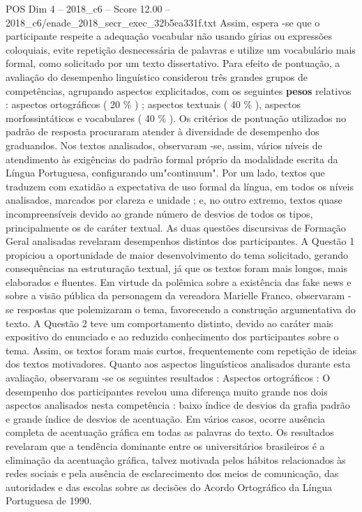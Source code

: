 \begin{textsample}{POS Dim 4 – 2018\_c6 – Score 12.00 – 2018\_c6/enade\_2018\_secr\_exec\_32b5ea331f.txt}
Assim, espera -se que o participante respeite a adequação vocabular não usando gírias ou expressões coloquiais, evite repetição desnecessária de palavras e utilize um vocabulário mais formal, como solicitado por um texto dissertativo.
Para efeito de pontuação, a avaliação do desempenho linguístico considerou três grandes grupos de competências, agrupando aspectos explicitados, com os seguintes \textbf{pesos} relativos : aspectos ortográficos ( 20 \% ) ; aspectos textuais ( 40 \% ), aspectos morfossintáticos e vocabulares ( 40 \% ).
Os critérios de pontuação utilizados no padrão de resposta procuraram atender à diversidade de desempenho dos graduandos.
Nos textos analisados, observaram -se, assim, vários níveis de atendimento às exigências do padrão formal próprio da modalidade escrita da Língua Portuguesa, configurando um"continuum".
Por um lado, textos que traduzem com exatidão a expectativa de uso formal da língua, em todos os níveis analisados, marcados por clareza e unidade ; e, no outro extremo, textos quase incompreensíveis devido ao grande número de desvios de todos os tipos, principalmente os de caráter textual.
As duas questões discursivas de Formação Geral analisadas revelaram desempenhos distintos dos participantes.
A Questão 1 propiciou a oportunidade de maior desenvolvimento do tema solicitado, gerando consequências na estruturação textual, já que os textos foram mais longos, mais elaborados e fluentes.
Em virtude da polêmica sobre a existência das fake news e sobre a visão pública da personagem da vereadora Marielle Franco, observaram -se respostas que polemizaram o tema, favorecendo a construção argumentativa do texto.
A Questão 2 teve um comportamento distinto, devido ao caráter mais expositivo do enunciado e ao reduzido conhecimento dos participantes sobre o tema.
Assim, os textos foram mais curtos, frequentemente com repetição de ideias dos textos motivadores.
Quanto aos aspectos linguísticos analisados durante esta avaliação, observaram -se os seguintes resultados : Aspectos ortográficos : O desempenho dos participantes revelou uma diferença muito grande nos dois aspectos analisados nesta competência : baixo índice de desvios da grafia padrão e grande índice de desvios de acentuação.
Em vários casos, ocorre ausência completa de acentuação gráfica em todas as palavras do texto.
Os resultados revelaram que a tendência dominante entre os universitários brasileiros é a eliminação da acentuação gráfica, talvez motivada pelos hábitos relacionados às redes sociais e pela ausência de esclarecimento dos meios de comunicação, das autoridades e das escolas sobre as decisões do Acordo Ortográfico da Língua Portuguesa de 1990.

\end{textsample}
